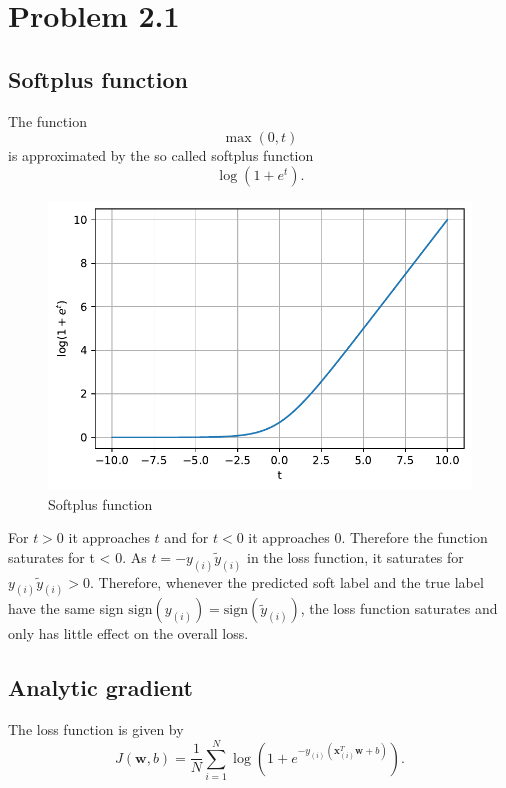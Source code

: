 \documentclass[12pt,a4paper]{scrartcl}
\newcommand{\matr}[1]{\mathbf{#1}}
\begin{document}
	
	\section*{Problem 2.1}
	\subsection*{Softplus function}
	The function
	\begin{equation}
		\max(0, t)
	\end{equation}
	is approximated by the so called softplus function
	\begin{equation}
		\log(1+e^t).
		\label{eq:softplus}
	\end{equation}

	\begin{figure}[H]
		\centering	\includegraphics[width=0.85\linewidth]{figs/ex2_1_softplus.pdf}
		\caption{Softplus function }
		\label{fig:ex2_1_softplus}
	\end{figure}
	
	For $t>0$ it approaches $t$ and for $t<0$ it approaches 0. Therefore the function saturates for t < 0.
	As $t=-y_{(i)} \tilde{y}_{(i)}$ in the loss function, it saturates for $y_{\left(i\right)} \tilde{y}_{(i)} > 0$. Therefore, whenever the predicted soft label and the true label have the same sign  $\mathrm{sign}({y_{(i)}}) = \mathrm{sign}(\tilde{y}_{(i)})$, the loss function saturates and only has little effect on the overall loss.

	\subsection*{Analytic gradient}
	The loss function is given by
	\begin{equation}
		J(\matr{w}, b) = \frac{1}{N} \sum_{i=1}^{N} \log \left(1+e^{-y_{(i)}\left( \matr{x}_{(i)}^T \matr{w} + b\right) }\right).
	\end{equation}
\end{document}
